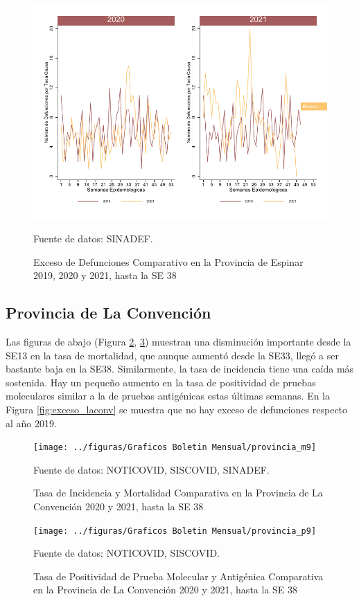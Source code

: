 \documentclass[12pt,a4paper,openany]{book}
\begin{document}
	\begin{figure}[h]
	\caption{Exceso de Defunciones Comparativo en la Provincia de Espinar 2019, 2020 y 2021, hasta la SE 38}\label{fig:exceso_espinar}
	\begin{center}
		\includegraphics[width=0.7\linewidth]{../figuras/exceso_8}
	\end{center}
	{\footnotesize {Fuente de datos: SINADEF.}}
	\end{figure}

\clearpage

	\subsection*{Provincia de La Convención}
	\noindent Las figuras de abajo (Figura \ref{fig:inc_mort_laconv}, \ref{fig:positividad_laconv})  muestran una disminución importante desde la SE13 en la tasa de mortalidad, que aunque aumentó desde la SE33, llegó a ser bastante baja en la SE38. Similarmente, la tasa de incidencia tiene una caída más sostenida. Hay un pequeño aumento en la tasa de positividad de pruebas moleculares similar a la de pruebas antigénicas estas últimas semanas. En la Figura \ref{fig:exceso_laconv} se muestra que no hay exceso de defunciones respecto al año 2019.

	\begin{figure}[h]
	\caption{Tasa de Incidencia y Mortalidad Comparativa en la Provincia de La Convención 2020 y 2021, hasta la SE 38}\label{fig:inc_mort_laconv}
	\begin{center}
		\texttt{[image: ../figuras/Graficos Boletin Mensual/provincia\_m9]}
	\end{center}
	{\footnotesize {Fuente de datos: NOTICOVID, SISCOVID, SINADEF.}}
	\end{figure}

	\begin{figure}[h]
	\caption{Tasa de Positividad de Prueba Molecular y Antigénica Comparativa en la Provincia de La Convención 2020 y 2021, hasta la SE 38}\label{fig:positividad_laconv}
	\begin{center}
		\texttt{[image: ../figuras/Graficos Boletin Mensual/provincia\_p9]}
	\end{center}
	{\footnotesize {Fuente de datos: NOTICOVID, SISCOVID.}}
	\end{figure}
\end{document}
